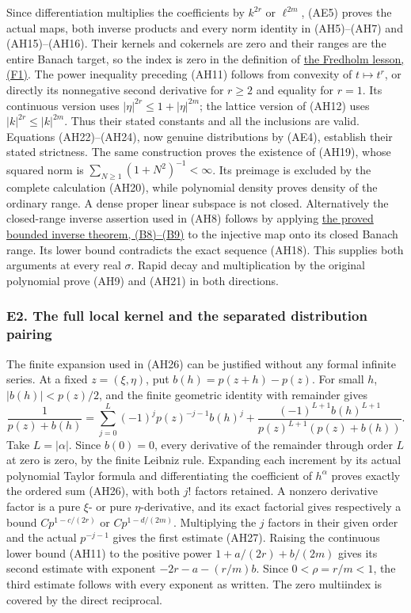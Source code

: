 \documentclass[
  11pt,
]{article}
\begin{document}
Since differentiation multiplies the coefficients by \(k^{2r}\) or
\(\ell^{2m}\), (AE5) proves the actual maps, both inverse products and
every norm identity in (AH5)--(AH7) and (AH15)--(AH16). Their kernels
and cokernels are zero and their ranges are the entire Banach target, so
the index is zero in the definition of
\href{fredholm-stability.pdf\#section*.2}{the
Fredholm lesson, (F1)}. The power inequality preceding (AH11) follows
from convexity of \(t\mapsto t^r\), or directly its nonnegative second
derivative for \(r\geq2\) and equality for \(r=1\). Its continuous
version uses \(|\eta|^{2r}\leq1+|\eta|^{2m}\); the lattice version of
(AH12) uses \(|k|^{2r}\leq|k|^{2m}\). Thus their stated constants and
all the inclusions are valid. Equations (AH22)--(AH24), now genuine
distributions by (AE4), establish their stated strictness. The same
construction proves the existence of (AH19), whose squared norm is
\(\sum_{N\geq1}(1+N^2)^{-1}<\infty\). Its preimage is excluded by the
complete calculation (AH20), while polynomial density proves density of
the ordinary range. A dense proper linear subspace is not closed.
Alternatively the closed-range inverse assertion used in (AH8) follows
by applying
\href{banach-foundation-bridges.pdf\#section*.19}{the
proved bounded inverse theorem, (B8)--(B9)} to the injective map onto
its closed Banach range. Its lower bound contradicts the exact sequence
(AH18). This supplies both arguments at every real \(\sigma\). Rapid
decay and multiplication by the original polynomial prove (AH9) and
(AH21) in both directions.

\subsubsection{E2. The full local kernel and the separated distribution
pairing}\label{e2.-the-full-local-kernel-and-the-separated-distribution-pairing}

The finite expansion used in (AH26) can be justified without any formal
infinite series. At a fixed \(z=(\xi,\eta)\), put \(b(h)=p(z+h)-p(z)\).
For small \(h\), \(|b(h)|<p(z)/2\), and the finite geometric identity
with remainder gives \[
 \frac1{p(z)+b(h)}
 =\sum_{j=0}^{L}(-1)^j p(z)^{-j-1}b(h)^j
  +\frac{(-1)^{L+1}b(h)^{L+1}}
              {p(z)^{L+1}(p(z)+b(h))}.
 \tag{AE6}
\] Take \(L=|\alpha|\). Since \(b(0)=0\), every derivative of the
remainder through order \(L\) at zero is zero, by the finite Leibniz
rule. Expanding each increment by its actual polynomial Taylor formula
and differentiating the coefficient of \(h^\alpha\) proves exactly the
ordered sum (AH26), with both \(j!\) factors retained. A nonzero
derivative factor is a pure \(\xi\)- or pure \(\eta\)-derivative, and
its exact factorial gives respectively a bound \(C p^{1-c/(2r)}\) or
\(C p^{1-d/(2m)}\). Multiplying the \(j\) factors in their given order
and the actual \(p^{-j-1}\) gives the first estimate (AH27). Raising the
continuous lower bound (AH11) to the positive power \(1+a/(2r)+b/(2m)\)
gives its second estimate with exponent \(-2r-a-(r/m)b\). Since
\(0<\rho=r/m<1\), the third estimate follows with every exponent as
written. The zero multiindex is covered by the direct reciprocal.
\end{document}
